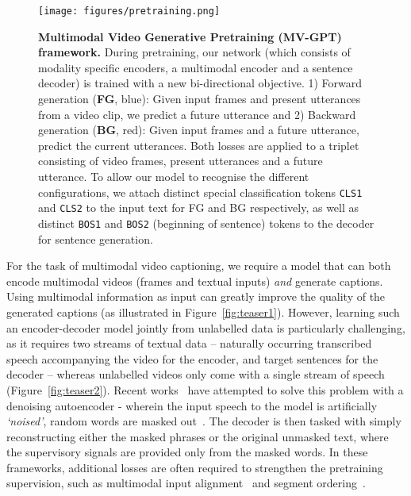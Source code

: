 \documentclass[10pt,twocolumn,letterpaper]{article}
\begin{document}
\begin{figure*}
    \centering
    \texttt{[image: figures/pretraining.png]}
    \caption{\textbf{Multimodal Video Generative Pretraining (MV-GPT) framework.}
    During pretraining, our network (which consists of 
    modality specific encoders, a multimodal encoder and a sentence decoder)
    is trained with a new bi-directional objective.
    1) Forward generation ({\bf FG}, \colorbox[RGB]{220,230,242}{blue}): Given input frames and present utterances from a video clip, we predict a future utterance and 2) Backward generation ({\bf BG}, \colorbox[RGB]{242,220,219}{red}): Given input frames and a future utterance, predict the current utterances. Both losses are applied to a triplet consisting of video frames, present utterances and a future utterance. 
    To allow our model to recognise the different configurations, we attach distinct special classification tokens \texttt{CLS1} and \texttt{CLS2} to the input text for FG and BG respectively, as well as distinct \texttt{BOS1} and \texttt{BOS2} (beginning of sentence) tokens to the decoder for sentence generation.
	}
    \label{fig:framework}
    \vspace{-0.1cm}
\end{figure*}
For the task of multimodal video captioning, we require a model that can both encode multimodal videos (\ie frames and textual inputs) \textit{and} generate captions. Using multimodal information as input can greatly improve the quality of the generated captions (as illustrated in Figure~\ref{fig:teaser1}). 
However, learning such 
an encoder-decoder model jointly
from unlabelled data is particularly challenging, as it requires two streams of textual data -- naturally occurring transcribed speech accompanying the video for the encoder, and target sentences for the decoder -- whereas unlabelled videos only come with a single stream of speech (Figure~\ref{fig:teaser2}).
Recent works~\cite{korbar2020video,luo2020univl, huang2020multimodal} have attempted to solve this problem 
with a denoising autoencoder - wherein the input speech to the model is artificially \textit{`noised'}, \ie random words are masked out~\cite{korbar2020video,luo2020univl, huang2020multimodal}. The decoder is then tasked with simply reconstructing either the masked phrases or the original unmasked text, where the supervisory signals are provided only from the masked words.
In these frameworks, additional losses are often required to strengthen the pretraining supervision, such as multimodal input alignment~\cite{luo2020univl} and segment ordering~\cite{huang2020multimodal}. 
\end{document}
